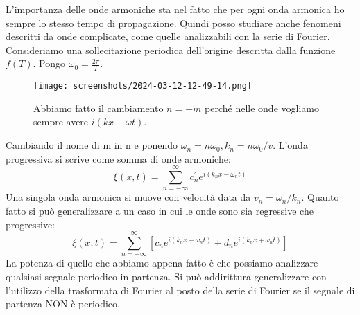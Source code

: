 L'importanza delle onde armoniche sta nel fatto che per ogni onda armonica ho sempre lo stesso tempo di propagazione. Quindi posso studiare anche fenomeni descritti da onde complicate, come quelle analizzabili con la serie di Fourier. Consideriamo una sollecitazione periodica dell'origine descritta dalla funzione \(f(T)\). Pongo \(\omega _0 = \frac{2\pi }{T}\).
\begin{figure}[H]
	\centering
	\texttt{[image: screenshots/2024-03-12-12-49-14.png]}
	\caption{Abbiamo fatto il cambiamento \(n=-m\) perché nelle onde vogliamo sempre avere \(i(kx - \omega t)\).  }
\end{figure}
Cambiando il nome di m in n e ponendo \(\omega _n = n \omega _0, k_n = n \omega _0 / v\). L'onda progressiva si scrive come somma di onde armoniche:
\[
	\xi (x,t) = \sum_{n=-\infty }^{\infty} c^{\prime}_n e^{i(k_n x - \omega _n t)}
\]
Una singola onda armonica si muove con velocità data da \(v_n = \omega_n / k_n\). Quanto fatto si può generalizzare a un caso in cui le onde sono sia regressive che progressive:
\[
	\xi (x,t) = \sum_{n=-\infty }^{\infty} [c_n e^{i(k_n x - \omega _n t)} + d_n e^{i(k_n x + \omega _n t)}]
\]
La potenza di quello che abbiamo appena fatto è che possiamo analizzare qualsiasi segnale periodico in partenza. Si può addirittura generalizzare con l'utilizzo della trasformata di Fourier al posto della serie di Fourier se il segnale di partenza NON è periodico.